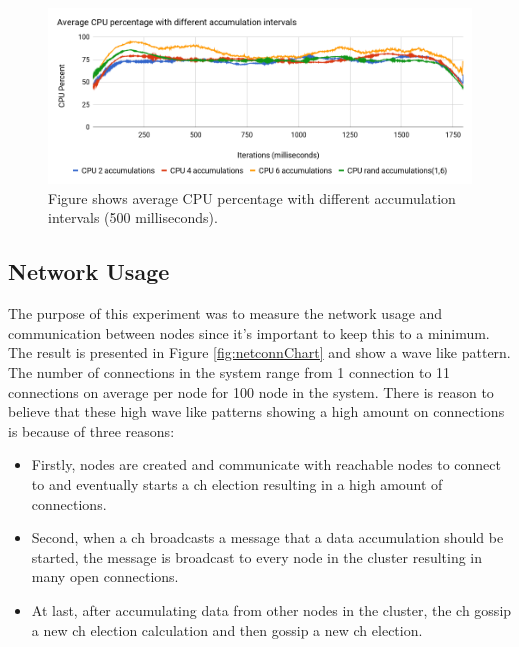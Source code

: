 \documentclass[USenglish]{uit-thesis}
\begin{document}
\begin{figure} [ht]
\centering
\includegraphics[width=\textwidth]{cpuChart.png}
\caption{Figure shows average CPU percentage with different accumulation intervals (500 milliseconds).}
\label{fig:cpuChart}
\end{figure}



\newpage

\subsection{Network Usage}
The purpose of this experiment was to measure the network usage and communication between nodes since it's important to keep this to a minimum. The result is presented in Figure \ref{fig:netconnChart} and show a wave like pattern. The number of connections in the system range from 1 connection to 11 connections on average per node for 100 node in the system.
There is reason to believe that these high wave like patterns showing a high amount on connections is because of three reasons:

\begin{itemize}
\item Firstly, nodes are created and communicate with reachable nodes to connect to and eventually starts a \gls{ch} election resulting in a high amount of connections.
\item Second, when a \gls{ch} broadcasts a message that a data accumulation should be started, the message is broadcast to every node in the cluster resulting in many open connections.
\item At last, after accumulating data from other nodes in the cluster, the \gls{ch} gossip a new \gls{ch} election calculation and then gossip a new \gls{ch} election.
\end{itemize}
\end{document}
